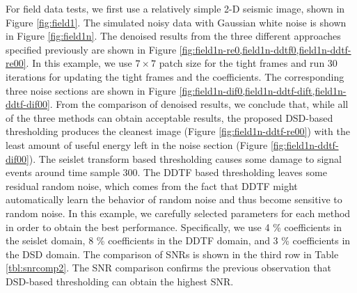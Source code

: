For field data tests, we first use a relatively simple 2-D seismic image, shown in Figure \ref{fig:field1}. The simulated noisy data with Gaussian white noise is shown in Figure \ref{fig:field1n}. The denoised results from the three different approaches specified previously are shown in Figure \ref{fig:field1n-re0,field1n-ddtf0,field1n-ddtf-re00}. In this example, we use $7\times7$ patch size for the tight frames and run 30 iterations for updating the tight frames and the coefficients. The corresponding three noise sections are shown in Figure \ref{fig:field1n-dif0,field1n-ddtf-dift,field1n-ddtf-dif00}. From the comparison of denoised results, we conclude that, while all of the three methods can obtain acceptable results, the proposed DSD-based thresholding produces the cleanest image (Figure \ref{fig:field1n-ddtf-re00}) with the least amount of useful energy left in the noise section (Figure \ref{fig:field1n-ddtf-dif00}). The seislet transform based thresholding causes some damage to signal events around time sample 300. The DDTF based thresholding leaves some residual random noise, which comes from the fact that DDTF might automatically learn the behavior of random noise and thus become sensitive to random noise. %
In this example, we carefully selected parameters for each method in order to obtain the best performance. Specifically, we use 4 \% coefficients in the seislet domain, 8 \% coefficients in the DDTF domain, and 3 \% coefficients in the DSD domain. %
The comparison of SNRs is shown in the third row in Table \ref{tbl:snrcomp2}. The SNR comparison confirms the previous observation that DSD-based thresholding can obtain the highest SNR.




